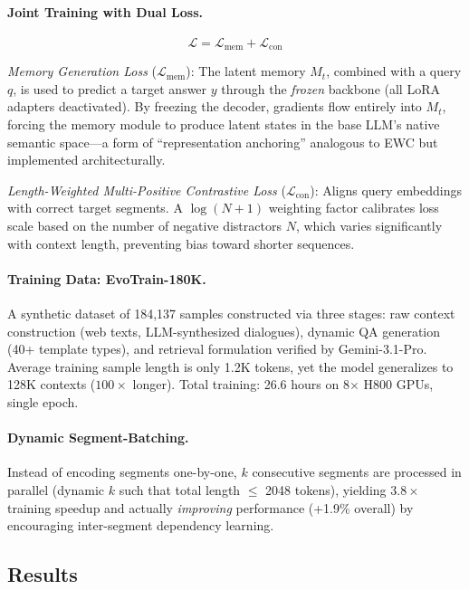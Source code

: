 \documentclass[11pt,a4paper]{article}
\begin{document}
\paragraph{Joint Training with Dual Loss.}
\begin{equation}
\mathcal{L} = \mathcal{L}_{\mathrm{mem}} + \mathcal{L}_{\mathrm{con}}
\end{equation}

\emph{Memory Generation Loss} ($\mathcal{L}_{\mathrm{mem}}$): The latent memory $M_t$, combined with a query $q$, is used to predict a target answer $y$ through the \emph{frozen} backbone (all LoRA adapters deactivated). By freezing the decoder, gradients flow entirely into $M_t$, forcing the memory module to produce latent states in the base LLM's native semantic space---a form of ``representation anchoring'' analogous to EWC but implemented architecturally.

\emph{Length-Weighted Multi-Positive Contrastive Loss} ($\mathcal{L}_{\mathrm{con}}$): Aligns query embeddings with correct target segments. A $\log(N+1)$ weighting factor calibrates loss scale based on the number of negative distractors $N$, which varies significantly with context length, preventing bias toward shorter sequences.

\paragraph{Training Data: EvoTrain-180K.} A synthetic dataset of 184,137 samples constructed via three stages: raw context construction (web texts, LLM-synthesized dialogues), dynamic QA generation (40+ template types), and retrieval formulation verified by Gemini-3.1-Pro. Average training sample length is only 1.2K tokens, yet the model generalizes to 128K contexts ($100\times$ longer). Total training: 26.6 hours on 8$\times$ H800 GPUs, single epoch.

\paragraph{Dynamic Segment-Batching.} Instead of encoding segments one-by-one, $k$ consecutive segments are processed in parallel (dynamic $k$ such that total length $\leq$ 2048 tokens), yielding $3.8\times$ training speedup and actually \emph{improving} performance (+1.9\% overall) by encouraging inter-segment dependency learning.

\subsection{Results}
\end{document}
